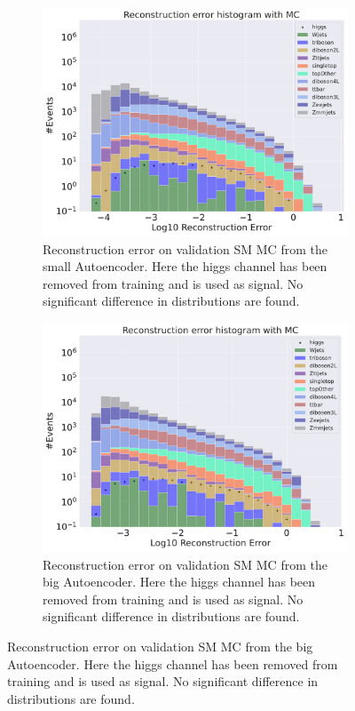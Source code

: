 \begin{figure}[h!]
    \centering
    \begin{subfigure}{.45\textwidth}
        \includegraphics[width=\textwidth]{Figures/AE_testing/small/b_data_recon_big_rm3_feats_sig_higgs.pdf}
        \caption{Reconstruction error on validation SM MC from the small Autoencoder. Here the higgs channel has been removed from training and 
        is used as signal. No significant difference in distributions are found.}
        \label{fig:ae_small_higgs}
    \end{subfigure}
    \hfill 
    \begin{subfigure}{.45\textwidth}
        \includegraphics[width=\textwidth]{Figures/AE_testing/big/b_data_recon_big_rm3_feats_sig_higgs.pdf}
        \caption{Reconstruction error on validation SM MC from the big Autoencoder. Here the higgs channel has been removed from training and 
        is used as signal. No significant difference in distributions are found. }
        \label{fig:ae_big_higgs}
    \end{subfigure}
    \hfill  
    \label{fig:ae_big_channel_1}
\end{figure}

